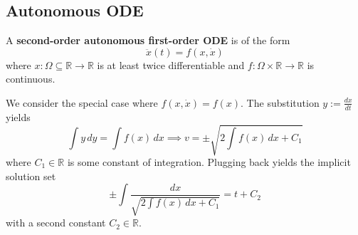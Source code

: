 \subsection*{Autonomous ODE}
\begin{definition}
    A \textbf{second-order autonomous first-order ODE} is of the form
    \begin{equation}
        \ddot{x}(t)=f(x, \dot{x})
    \end{equation}
    where $x: \Omega \subseteq \mathbb{R} \to \mathbb{R}$ is at least twice differentiable and $f: \Omega \times \mathbb{R} \to \mathbb{R}$ is continuous.
\end{definition}
We consider the special case where $f(x,\dot{x})=f(x)$. The substitution $y:=\frac{dx}{dt}$ yields
\[
    \int y \, dy = \int f(x) \, dx \implies v= \pm \sqrt{2 \int f(x) \, dx + C_1}
\] where $C_1 \in \mathbb{R}$ is some constant of integration. Plugging back yields the implicit solution set
\begin{equation}
    \pm \int \frac{dx}{\sqrt{2 \int f(x)\, dx + C_1}} = t +C_2
\end{equation}
with a second constant $C_2 \in \mathbb{R}$. 
